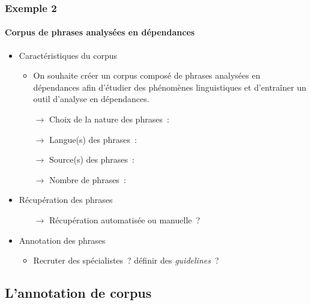 \begin{frame}
\frametitle{Exemple 2}
\framesubtitle{Corpus de phrases analysées en dépendances}

\begin{itemize} \itemsep10pt
    \item Caractéristiques du corpus
    \begin{itemize}
        \item On souhaite créer un corpus composé de phrases analysées en 
              dépendances afin d'étudier des phénomènes linguistiques
              et d'entraîner un outil d'analyse en dépendances.
        \item[$\to$] Choix de la nature des phrases~: \underline{\qquad}
        \item[$\to$] Langue(s) des phrases~: \underline{\qquad}
        \item[$\to$] Source(s) des phrases~: \underline{\qquad}
        \item[$\to$] Nombre de phrases~: \underline{\qquad}
    \end{itemize}
    \item Récupération des phrases
    \begin{itemize}
        \item[$\to$] Récupération automatisée ou manuelle~?
    \end{itemize}
    \item Annotation des phrases
    \begin{itemize}
        \item Recruter des spécialistes~? définir des \textit{guidelines}~? 
    \end{itemize}

\end{itemize}

\end{frame}


\subsection{L'annotation de corpus}

